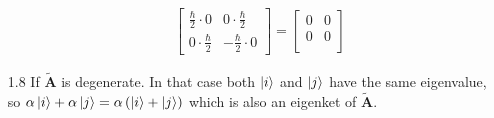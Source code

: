 \documentclass[12pt]{article}
\newcommand{\op}[1]{\tilde{\mathbf{#1}}}
\begin{document}
\begin{enumerate}
\begin{enumerate}
\begin{gather*}
\begin{bmatrix}
                    \frac{\hbar}{2}\cdot0 & 0\cdot\frac{\hbar}{2}  \\
                    0\cdot\frac{\hbar}{2} & -\frac{\hbar}{2}\cdot0
                \end{bmatrix}=
                \begin{bmatrix}
                    0 & 0 \\
                    0 & 0 \\
                \end{bmatrix}
            \end{gather*}
        \end{enumerate}
        \item[1.8]
        If $\op{A}$ is degenerate.
        In that case both $\ket{i}$ and $\ket{j}$ have the same eigenvalue, so $\alpha\ket{i}+\alpha\ket{j}=\alpha\left(\ket{i}+\ket{j}\right)$ which is also an eigenket of $\op{A}$.
    \end{enumerate}
\end{document}
